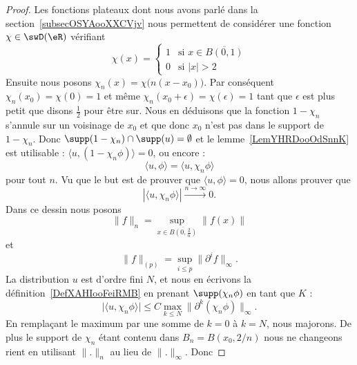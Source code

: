 \begin{proof}
    Les fonctions plateaux dont nous avons parlé dans la section~\ref{subsecOSYAooXXCVjv} nous permettent de considérer une fonction \( \chi\in\swD(\eR)\) vérifiant
    \begin{equation}
        \chi(x)=\begin{cases}
            1    &   \text{si } x\in\overline{ B(0,1) }\\
            0    &    \text{si } | x |>2
        \end{cases}
    \end{equation}
    Ensuite nous posons \( \chi_n(x)=\chi\big( n(x-x_0) \big)\). Par conséquent \( \chi_n(x_0)=\chi(0)=1\) et même \( \chi_n(x_0+\epsilon)=\chi(\epsilon)=1\) tant que \( \epsilon\) est plus petit que disons \( \frac{ 1 }{2}\) pour être sur. Nous en déduisons que la fonction \( 1-\chi_n\) s'annule sur un voisinage de \( x_0\) et que donc \( x_0\) n'est pas dans le support de \( 1-\chi_n\). Donc \( \supp(1-\chi_n)\cap\supp(u)=\emptyset\) et le lemme~\ref{LemYHRDooOdSnnK} est utilisable :
        $\langle u, (1-\chi_n\phi)\rangle =0$, ou encore :
        \begin{equation}
            \langle u, \phi\rangle =\langle u, \chi_n\phi\rangle
        \end{equation}
        pour tout \( n\). Vu que le but est de prouver que \( \langle u, \phi\rangle =0\), nous allons prouver que
        \begin{equation}
            | \langle u, \chi_n\phi\rangle  |\stackrel{n\to\infty}{\longrightarrow}0.
        \end{equation}
        Dans ce dessin nous posons
        \begin{equation}
            \| f \|_n=\sup_{x\in\overline{ B(0,\frac{ 2 }{ n })}}\| f(x) \|
        \end{equation}
        et
        \begin{equation}
            \| f \|_{(p)}=\sup_{i\leq p}\| \partial^if \|_{\infty}.
        \end{equation}
        La distribution \( u\) est d'ordre fini \( N\), et nous en écrivons la définition~\ref{DefXAHIooFeiRMB} en prenant \( \supp(\chi_n\phi)\) en tant que \( K\) :
        \begin{equation}
            \big| \langle u, \chi_n\phi\rangle  \big|\leq C\max_{k\leq N}\| \partial^k(\chi_n\phi) \|_{\infty}.
        \end{equation}
        En remplaçant le maximum par une somme de \( k=0\) à \( k=N\), nous majorons. De plus le support de \( \chi_n\) étant contenu dans \( B_n=B(x_0,2/n)\) nous ne changeons rient en utilisant \( \| . \|_n\) au lieu de \( \| . \|_{\infty}\). Donc

\end{proof}
